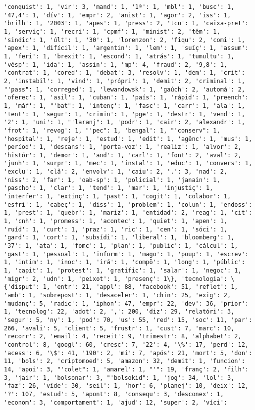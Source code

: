 \documentclass[11pt]{article}
\begin{document}
\begin{Verbatim}[commandchars=\\\{\}]
'conquist': 1, 'vir': 3, 'mand': 1, '1ª': 1, 'mbl': 1, 'busc': 1, '47,4': 1, 'dív': 1, 'empr': 2, 'anist': 1, 'agor': 2, 'iss': 1, 'brilh': 1, '2003': 1, 'apes': 1, 'press': 2, 'tcu': 1, 'caixa-pret': 1, 'serviç': 1, 'recri': 1, 'cpmf': 1, 'minist': 2, 'têm': 1, 'sindic': 1, 'últ': 1, '30': 1, 'lorenzon': 2, 'fiqu': 2, 'comi': 1, 'apex': 1, 'difícil': 1, 'argentin': 1, 'lem': 1, 'suíç': 1, 'assum': 1, 'feri': 1, 'brexit': 1, 'escond': 1, 'atrás': 1, 'tumultu': 1, 'vésp': 1, 'ida': 1, 'assin': 1, 'mp': 4, 'fraud': 2, '9,8': 1, 'contrat': 1, 'cored': 1, 'debat': 3, 'resolv': 1, 'dem': 1, 'crit': 2, 'instabil': 1, 'vind': 1, 'própri': 1, 'demit': 2, 'criminal': 1, "'pass": 1, 'correged': 1, 'lewandowsk': 1, 'gaúch': 2, 'automá': 2, 'oferec': 1, 'asil': 1, 'cuban': 1, 'país': 1, 'rápid': 1, 'preench': 1, 'máf': 1, "'bat": 1, 'intenç': 1, 'fasc': 1, 'carr': 1, 'ala': 1, 'tent': 1, 'segur': 1, 'crimin': 1, 'pge': 1, 'destr': 1, 'vend': 1, '2': 1, 'uni': 1, "'laranj": 1, 'podr': 1, 'cair': 2, 'alexandr': 1, 'frot': 1, 'revog': 1, "'pec": 1, 'bengal': 1, "'conserv": 1, 'hospital': 1, 'reje': 1, 'estud': 1, 'edit': 1, 'agênc': 1, 'mus': 1, 'períod': 1, 'descans': 1, 'porta-voz': 1, 'realiz': 1, 'alvor': 2, 'histór': 1, 'demor': 1, 'and': 1, 'carl': 1, 'font': 2, 'aval': 2, 'junh': 1, 'surpr': 1, 'mec': 1, 'instal': 1, 'educ': 1, 'convers': 1, 'exclu': 1, 'clã': 2, 'envolv': 1, 'caiu': 2, '.': 3, 'nad': 2, 'niss': 2, 'far': 1, 'oab-sp': 1, 'policial': 1, 'janain': 1, 'pascho': 1, 'clar': 1, 'tend': 1, 'mar': 1, 'injustiç': 1, 'interfer': 1, 'extinç': 1, 'past': 1, 'cogit': 1, 'colabor': 1, 'esfri': 1, 'cabeç': 1, 'diss': 1, 'problem': 1, 'colun': 1, 'endoss': 1, 'prest': 1, 'quebr': 1, 'mariz': 1, 'entidad': 2, 'reag': 1, 'cit': 1, 'cnh': 1, 'promess': 1, 'acontec': 1, 'quiet': 1, 'apen': 1, 'ruíd': 1, 'curt': 1, 'praz': 1, 'ric': 1, 'cen': 1, 'sóci': 1, 'gard': 1, 'cort': 1, 'subsídi': 1, 'liberal': 1, 'bloomberg': 1, '37': 1, 'ata': 1, 'fomc': 1, 'plan': 1, 'public': 1, 'cálcul': 1, 'gast': 1, 'pessoal': 1, 'inform': 1, 'mago': 1, 'poup': 1, 'escrev': 1, 'intim': 1, 'inoc': 1, 'irá': 1, 'compõ': 1, 'long': 1, 'públic': 1, 'capit': 1, 'protest': 1, 'gratific': 1, 'salar': 1, 'negoc': 1, 'migr': 2, 'udn': 1, 'peixot': 1, 'presenç': 1\}, 'tecnologia': \{'disput': 1, 'entr': 21, 'appl': 88, 'facebook': 51, 'reflet': 1, 'amb': 1, 'sobrepost': 1, 'desaceler': 1, 'chin': 25, 'exig': 2, 'mudanç': 5, 'radic': 1, 'iphon': 47, 'empr': 22, 'dev': 36, 'prior': 1, 'tecnolog': 22, 'adot': 2, ',': 200, 'diz': 29, 'relatóri': 3, 'segur': 5, 'ny': 1, 'pod': 70, 'us': 55, 'red': 15, 'soc': 11, 'par': 266, 'avali': 5, 'client': 5, 'frustr': 1, 'cust': 7, 'marc': 10, 'recorr': 2, 'email': 4, 'receit': 9, 'trimestr': 8, 'alphabet': 2, 'control': 8, 'googl': 60, 'cresc': 7, '22': 4, '\%': 17, 'perd': 12, 'acess': 6, '\$': 41, '190': 2, 'mi': 7, 'após': 21, 'mort': 5, 'don': 11, 'bols': 2, 'criptomoed': 5, 'amazon': 32, 'demit': 1, 'funcion': 14, 'apoi': 3, "'colet": 1, 'amarel': 1, "'": 19, 'franç': 2, 'filh': 3, 'jair': 1, 'bolsonar': 3, "'bolsokid": 1, 'jog': 34, 'lol': 3, 'faz': 26, 'víde': 30, 'seil': 1, 'hor': 6, 'planej': 10, 'deix': 12, '?': 107, 'estud': 5, 'apont': 8, 'consequ': 3, 'desconex': 1, 'econom': 3, 'comportament': 1, 'ajud': 12, 'super': 2, 'víci': 
\end{Verbatim}
\end{document}
